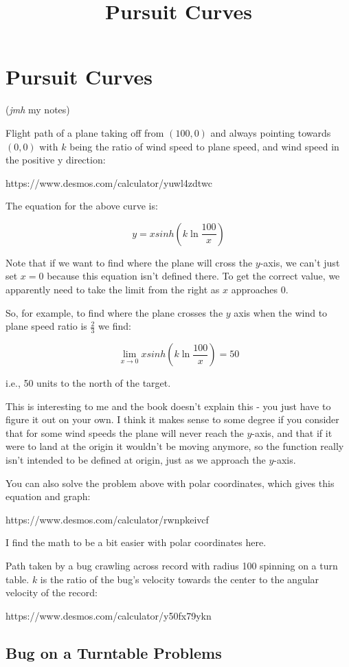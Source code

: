 \documentclass{article}
\title{Pursuit Curves}
\begin{document}
\section{Pursuit Curves}

(\emph{jmh} my notes)

Flight path of a plane taking off from $(100,0)$ and always pointing towards $(0,0)$ with $k$ being the ratio of wind speed to plane speed, and wind speed in the positive y direction:

https://www.desmos.com/calculator/yuwl4zdtwc

The equation for the above curve is:

\[ y = xsinh{(k \ln{\frac{100}{x}})} \]

Note that if we want to find where the plane will cross the $y$-axis, we can't just set $x = 0$ because this equation isn't defined there. To get the correct value, we apparently need to take the \@{limit} from the right as $x$ approaches $0$.

So, for example, to find where the plane crosses the $y$ axis when the wind to plane speed ratio is $\frac{2}{3}$ we find:

\[ \lim_{x\to0}  xsinh{(k \ln{\frac{100}{x}})} = 50 \]

i.e., 50 units to the north of the target.

This is interesting to me and the book doesn't explain this - you just have to figure it out on your own. I think it makes sense to some degree if you consider that for some wind speeds the plane will never reach the $y$-axis, and that if it were to land at the origin it wouldn't be moving anymore, so the function really isn't intended to be defined at origin, just as we approach the $y$-axis.

You can also solve the problem above with polar coordinates, which gives this equation and graph:

https://www.desmos.com/calculator/rwnpkeivcf

I find the math to be a bit easier with polar coordinates here.

Path taken by a bug crawling across record with radius 100 spinning on a turn table. $k$ is the ratio of the bug's velocity towards the center to the angular velocity of the record:

https://www.desmos.com/calculator/y50fx79ykn

\subsection{Bug on a Turntable Problems}
\end{document}
